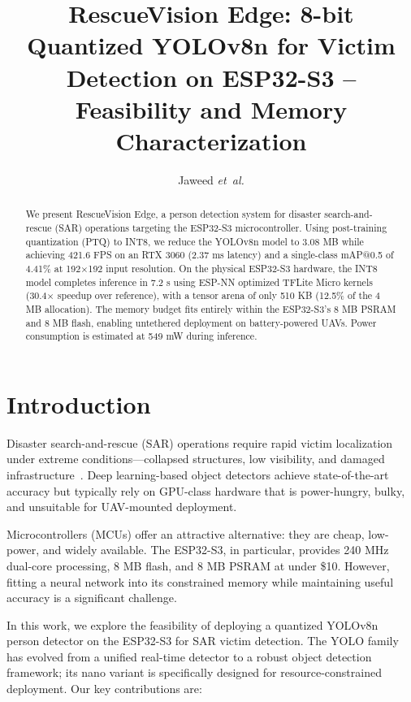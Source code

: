 \documentclass[10pt,twocolumn]{article}
\title{RescueVision Edge: 8-bit Quantized YOLOv8n for Victim Detection on ESP32-S3 -- Feasibility and Memory Characterization}
\author{Jaweed \textit{et~al.}}
\date{}
\begin{document}
\maketitle

\begin{abstract}
We present RescueVision Edge, a person detection system for disaster search-and-rescue (SAR) operations targeting the ESP32-S3 microcontroller. Using post-training quantization (PTQ) to INT8, we reduce the YOLOv8n model to 3.08 MB while achieving 421.6 FPS on an RTX 3060 (2.37 ms latency) and a single-class mAP@0.5 of 4.41\% at 192$\times$192 input resolution. On the physical ESP32-S3 hardware, the INT8 model completes inference in 7.2 s using ESP-NN optimized TFLite Micro kernels (30.4$\times$ speedup over reference), with a tensor arena of only 510 KB (12.5\% of the 4 MB allocation). The memory budget fits entirely within the ESP32-S3's 8 MB PSRAM and 8 MB flash, enabling untethered deployment on battery-powered UAVs. Power consumption is estimated at 549 mW during inference.
\end{abstract}

\section{Introduction}
\label{sec:intro}

Disaster search-and-rescue (SAR) operations require rapid victim localization under extreme conditions---collapsed structures, low visibility, and damaged infrastructure~\cite{zhang2022victim}. Deep learning-based object detectors achieve state-of-the-art accuracy but typically rely on GPU-class hardware that is power-hungry, bulky, and unsuitable for UAV-mounted deployment.

Microcontrollers (MCUs) offer an attractive alternative: they are cheap, low-power, and widely available. The ESP32-S3, in particular, provides 240 MHz dual-core processing, 8 MB flash, and 8 MB PSRAM at under \$10. However, fitting a neural network into its constrained memory while maintaining useful accuracy is a significant challenge.

In this work, we explore the feasibility of deploying a quantized YOLOv8n~\cite{ultralytics} person detector on the ESP32-S3 for SAR victim detection. The YOLO family~\cite{yolov1,yolov3,yolov4} has evolved from a unified real-time detector to a robust object detection framework; its nano variant is specifically designed for resource-constrained deployment. Our key contributions are:
\end{document}
